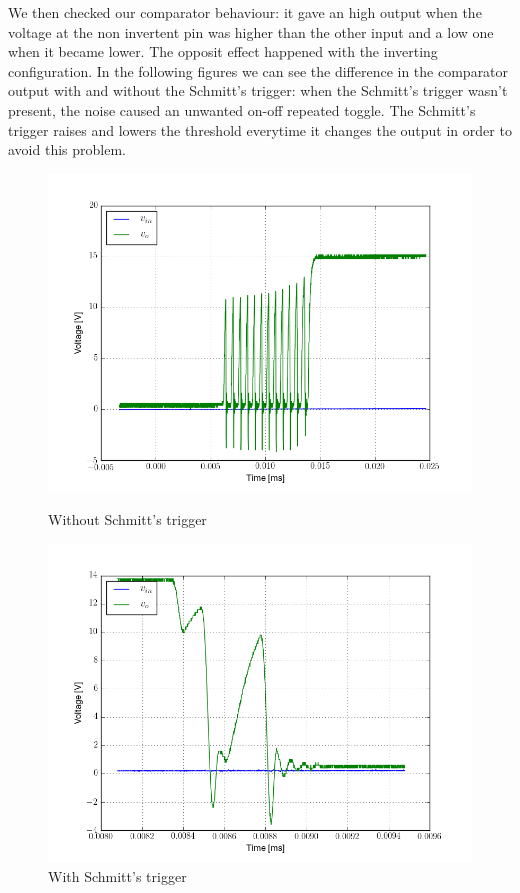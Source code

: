 We then checked our comparator behaviour: it gave an high output when the voltage at the non invertent pin was higher than the other input and a low one when it became lower. The opposit effect happened with the inverting configuration.
In the following figures we can see the difference in the comparator output with and without the Schmitt's trigger: when the Schmitt's trigger wasn't present, the noise caused an unwanted on-off repeated toggle. The Schmitt's trigger raises and lowers the threshold everytime it changes the output in order to avoid this problem.
\begin{figure}[H]
\begin{minipage}{.5\textwidth}
\centering
\includegraphics[width=\textwidth]{5/noise.png}
\caption{Without Schmitt's trigger}
\end{minipage}%
\begin{minipage}{.5\textwidth}
\centering
\includegraphics[width=\textwidth]{5/schmitt.png}
\caption{With Schmitt's trigger}
\end{minipage}
\end{figure}
